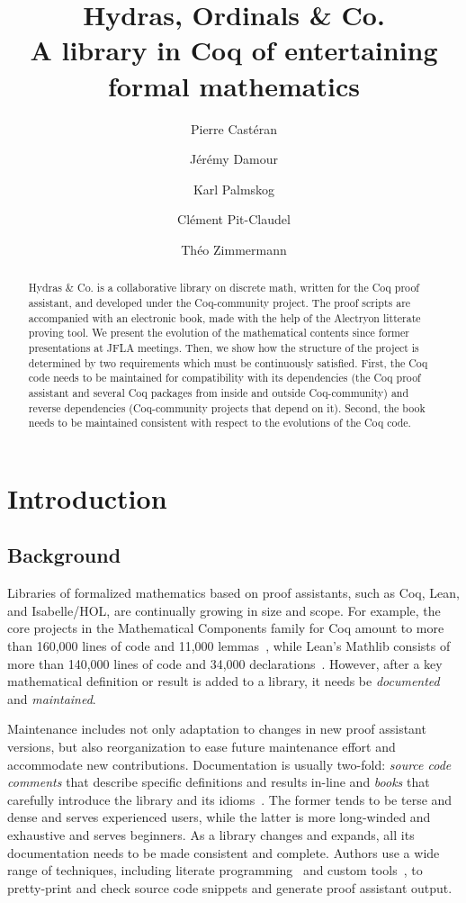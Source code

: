 \documentclass{easychair}
\title{Hydras,  Ordinals \& Co.   \\
  A library in Coq of entertaining formal mathematics}
\author{
Pierre Castéran \inst{1}
\and
    Jérémy Damour \inst{2}
\and
Karl Palmskog \inst{3}
\and Clément Pit-Claudel \inst{4}
\and Théo Zimmermann \inst{5}
}
\institute{
Univ. Bordeaux, CNRS, Bordeaux INP, LaBRI, UMR 5800, F-33400 Talence, France  %
\and
Univ. de Paris, F-75013 Paris, France
\and
KTH Royal Institute of Technology, Stockholm, Sweden
\and
MIT CSAIL, Cambridge, Massachusetts, USA
\and
Inria, Univ. de Paris, CNRS, IRIF, UMR 8243, F-75013 Paris, France
}
\newcommand{\TODO}[2][]{[\textcolor{red}{TODO (#1):} \emph{#2}]}
\newcommand{\coq}{Coq\xspace}
\newcommand{\community}{Coq-community\xspace}
\newcommand{\alectr}{Alectryon\xspace}
\newcommand{\Hydras}{Hydras \& Co.\xspace}
\begin{document}
\maketitle


\begin{abstract}
  \Hydras is a collaborative library on discrete math, written for the \coq  proof assistant, and developed under the \community project. The proof scripts are
  accompanied with an electronic book, made with the help of the \alectr litterate proving tool.
  We present the evolution of the mathematical contents since
  former presentations at JFLA meetings.
  Then, we show how the structure of the project is determined   by two  requirements which must be continuously satisfied.
   First, the Coq code needs to be maintained for compatibility with its dependencies (the Coq proof assistant and several Coq packages from inside and outside \community) and reverse dependencies (\community projects that depend on it).
   Second, the book needs to be maintained consistent with respect to the evolutions of the Coq code.
\end{abstract}




\section{Introduction}
\label{sect:introduction}

\subsection{Background}

Libraries of formalized mathematics based on proof assistants, such as \coq, Lean, and Isabelle/HOL, are continually growing in size and scope.
For example, the core projects in the Mathematical Components family for Coq amount to more than 160,000 lines of code and 11,000 lemmas~\cite{Nie2020a}, while Lean's Mathlib consists of more than 140,000 lines of code and 34,000 declarations~\cite{Mathlib}. However, after a key mathematical definition or result is added to a library, it needs be \emph{documented} and \emph{maintained}.

Maintenance includes not only adaptation to changes in new proof assistant versions, but also reorganization to ease future maintenance effort and accommodate new contributions. Documentation is usually two-fold: \emph{source code comments} that describe specific definitions and results in-line and \emph{books} that carefully introduce the library and its idioms~\cite{MCB}. The former tends to be terse and dense and serves experienced users, while the latter is more long-winded and exhaustive and serves beginners. As a library changes and expands, all its documentation needs to be made consistent and complete. Authors use a wide range of techniques, including literate programming~\cite{Knuth1984} and custom tools~\cite{vanDoorn2020}, to pretty-print and check source code snippets and generate proof assistant output.
\end{document}
